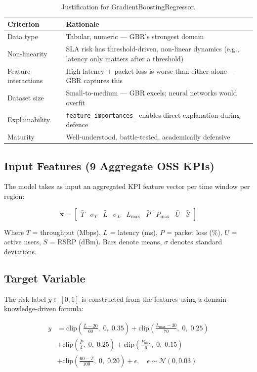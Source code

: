 \begin{table}[H]
\centering
\caption{Justification for GradientBoostingRegressor.}
\label{tab:gbr-justification}
\begin{tabularx}{\textwidth}{@{}lX@{}}
\toprule
\textbf{Criterion} & \textbf{Rationale} \\
\midrule
Data type & Tabular, numeric --- GBR's strongest domain \\
Non-linearity & SLA risk has threshold-driven, non-linear dynamics (e.g., latency only matters after a threshold) \\
Feature interactions & High latency + packet loss is worse than either alone --- GBR captures this \\
Dataset size & Small-to-medium --- GBR excels; neural networks would overfit \\
Explainability & \texttt{feature\_importances\_} enables direct explanation during defence \\
Maturity & Well-understood, battle-tested, academically defensive \\
\bottomrule
\end{tabularx}
\end{table}

\subsection{Input Features (9 Aggregate OSS KPIs)}

The model takes as input an aggregated KPI feature vector per time window per region:

$$\mathbf{x} = \begin{bmatrix} \bar{T} & \sigma_T & \bar{L} & \sigma_L & L_{\max} & \bar{P} & P_{\max} & \bar{U} & \bar{S} \end{bmatrix}$$

Where $T$ = throughput (Mbps), $L$ = latency (ms), $P$ = packet loss (\%), $U$ = active users, $S$ = RSRP (dBm). Bars denote means, $\sigma$ denotes standard deviations.

\subsection{Target Variable}

The risk label $y \in [0, 1]$ is constructed from the features using a domain-knowledge-driven formula:

\begin{align}
y &= \text{clip}\!\left(\frac{\bar{L} - 20}{60},\; 0,\; 0.35\right) 
   + \text{clip}\!\left(\frac{L_{\max} - 30}{70},\; 0,\; 0.25\right) \nonumber\\
  &+ \text{clip}\!\left(\frac{\bar{P}}{4},\; 0,\; 0.25\right)
   + \text{clip}\!\left(\frac{P_{\max}}{6},\; 0,\; 0.15\right) \nonumber\\
  &+ \text{clip}\!\left(\frac{60 - \bar{T}}{100},\; 0,\; 0.20\right)
   + \epsilon, \quad \epsilon \sim \mathcal{N}(0, 0.03)
\label{eq:risk-label}
\end{align}

